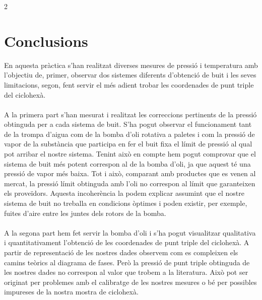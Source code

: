 \documentclass[12pt,twosides,onecolumn,openany]{article}
\begin{document}
\begin{multicols}{2}
\section{Conclusions}
En aquesta pràctica s'han realitzat diverses mesures de pressió i temperatura amb l'objectiu de, primer, observar dos sistemes diferents d'obtenció de buit i les seves limitacions, segon, fent servir el més adient trobar les coordenades de punt triple del ciclohexà.\\\\
A la primera part s'han mesurat i realitzat les correccions pertinents de la pressió obtinguda per a cada sistema de buit. S'ha pogut observar el funcionament tant de la trompa d'aigua com de la bomba d'oli rotativa a paletes i com la pressió de vapor de la substància que participa en fer el buit fixa el límit de pressió al qual pot arribar el nostre sistema. Tenint això en compte hem pogut comprovar que el sistema de buit més potent correspon al de la bomba d'oli, ja que aquest té una pressió de vapor més baixa. Tot i això, comparant amb productes que es venen al mercat, la pressió límit obtinguda amb l'oli no correspon al límit que garanteixen els proveïdors. Aquesta incoherència la podem explicar assumint que el nostre sistema de buit no treballa en condicions òptimes i poden existir, per exemple, fuites d'aire entre les juntes dels rotors de la bomba.\\\\
A la segona part hem fet servir la bomba d'oli i s'ha pogut visualitzar qualitativa i quantitativament l'obtenció de les coordenades de punt triple del ciclohexà. A partir de representació de les nostres dades observem com es compleixen els camins teòrics al diagrama de fases. Però la pressió de punt triple obtinguda de les nostres dades no correspon al valor que trobem a la literatura. Això pot ser originat per problemes amb el calibratge de les nostres mesures o bé per possibles impureses de la nostra mostra de ciclohexà.
\end{multicols}
 

\end{document}
